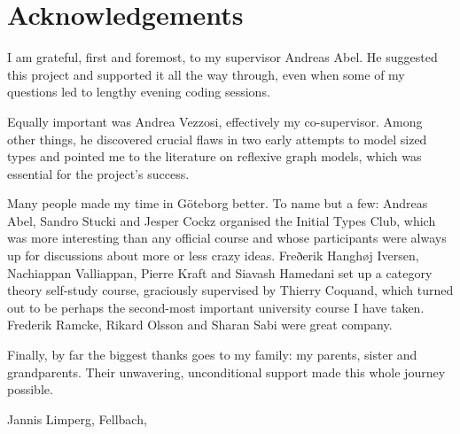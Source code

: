 \thispagestyle{plain}			%
\section*{Acknowledgements}

I am grateful, first and foremost, to my supervisor Andreas Abel. He suggested
this project and supported it all the way through, even when some of my
questions led to lengthy evening coding sessions.

Equally important was Andrea Vezzosi, effectively my co-supervisor. Among other
things, he discovered crucial flaws in two early attempts to model sized types
and pointed me to the literature on reflexive graph models, which was essential
for the project's success.

Many people made my time in Göteborg better. To name but a few: Andreas Abel,
Sandro Stucki and Jesper Cockz organised the Initial Types Club, which was more
interesting than any official course and whose participants were always up for
discussions about more or less crazy ideas. Freðerik Hanghøj Iversen, Nachiappan
Valliappan, Pierre Kraft and Siavash Hamedani set up a category theory
self-study course, graciously supervised by Thierry Coquand, which turned out to
be perhaps the second-most important university course I have taken. Frederik
Ramcke, Rikard Olsson and Sharan Sabi were great company.

Finally, by far the biggest thanks goes to my family: my parents, sister and
grandparents. Their unwavering, unconditional support made this whole journey
possible.


\vspace{1.5cm}
\hfill
Jannis Limperg, Fellbach, \monthname \space \the\year

\newpage				%
\thispagestyle{empty}
\mbox{}